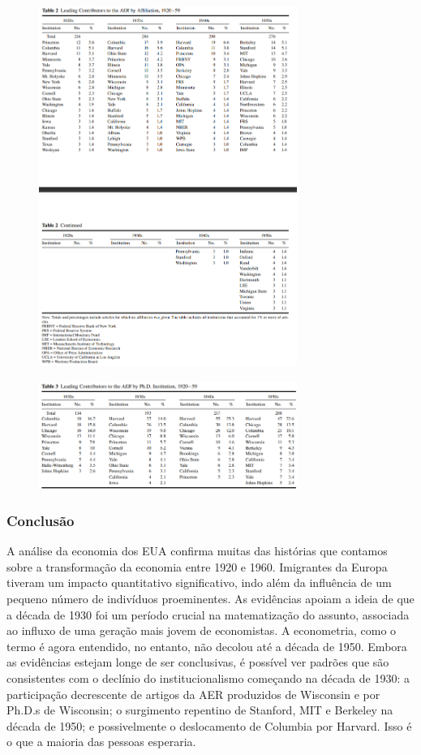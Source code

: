 \documentclass[12pt]{article}
\begin{document}
\begin{figure}[H]
    \centering
    \includegraphics[width=0.75\textwidth]{table 2.png}
    \end{figure}

\begin{figure}[H]
    \centering
    \includegraphics[width=0.75\textwidth]{table 3.png}
    \end{figure}

\subsubsection{\textbf{Conclusão}}
A análise da economia dos EUA confirma muitas das histórias que contamos sobre a transformação da economia entre 1920 e 1960. Imigrantes da Europa tiveram um impacto quantitativo significativo, indo além da influência de um pequeno número de indivíduos proeminentes. As evidências apoiam a ideia de que a década de 1930 foi um período crucial na matematização do assunto, associada ao influxo de uma geração mais jovem de economistas. A econometria, como o termo é agora entendido, no entanto, não decolou até a década de 1950. Embora as evidências estejam longe de ser conclusivas, é possível ver padrões que são consistentes com o declínio do institucionalismo começando na década de 1930: a participação decrescente de artigos da AER produzidos de Wisconsin e por Ph.D.s de Wisconsin; o surgimento repentino de Stanford, MIT e Berkeley na década de 1950; e possivelmente o deslocamento de Columbia por Harvard. Isso é o que a maioria das pessoas esperaria.
\end{document}
